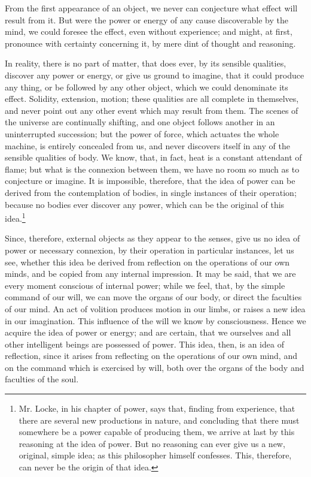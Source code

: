 \documentclass[]{article}
\newcounter{authornote}[page]
\newcommand*{\authornote}[1]{\renewcommand{\thefootnote}{\fnsymbol{footnote}}\stepcounter{authornote}\footnote[\value{authornote}]{#1}\renewcommand{\thefootnote}{\arabic{footnote}}}
\begin{document}
\begin{sectionbody}
\humeparagraph  From the first appearance of an object, we never can conjecture what effect will result from it. But were the power or energy of any cause discoverable by the mind, we could foresee the effect, even without experience; and might, at first, pronounce with certainty concerning it, by mere dint of thought and reasoning.

\humeparagraph  In reality, there is no part of matter, that does ever, by its sensible qualities, discover any power or energy, or give us ground to imagine, that it could produce any thing, or be followed by any other object, which we could denominate its effect. Solidity, extension, motion; these qualities are all complete in themselves, and never point out any other event which may result from them. The scenes of the universe are continually shifting, and one object follows another in an uninterrupted succession; but the power of force, which actuates the whole machine, is entirely concealed from us, and never discovers itself in any of the sensible qualities of body. We know, that, in fact, heat is a constant attendant of flame; but what is the connexion between them, we have no room so much as to conjecture or imagine. It is impossible, therefore, that the idea of power can be derived from the contemplation of bodies, in single instances of their operation; because no bodies ever discover any power, which can be the original of this idea.\authornote{ Mr. Locke, in his chapter of power, says that, finding from experience, that there are several new productions in nature, and concluding that there must somewhere be a power capable of producing them, we arrive at last by this reasoning at the idea of power. But no reasoning can ever give us a new, original, simple idea; as this philosopher himself confesses. This, therefore, can never be the origin of that idea.}

\humeparagraph  Since, therefore, external objects as they appear to the senses, give us no idea of power or necessary connexion, by their operation in particular instances, let us see, whether this idea be derived from reflection on the operations of our own minds, and be copied from any internal impression. It may be said, that we are every moment conscious of internal power; while we feel, that, by the simple command of our will, we can move the organs of our body, or direct the faculties of our mind. An act of volition produces motion in our limbs, or raises a new idea in our imagination. This influence of the will we know by consciousness. Hence we acquire the idea of power or energy; and are certain, that we ourselves and all other intelligent beings are possessed of power. This idea, then, is an idea of reflection, since it arises from reflecting on the operations of our own mind, and on the command which is exercised by will, both over the organs of the body and faculties of the soul.


\end{sectionbody}
\end{document}
